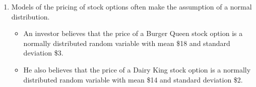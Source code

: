 \documentclass[12pt]{article} %
\newcommand{\Red}{\color{Red}}
\begin{document}
\begin{enumerate}
\newpage
\item Models of the pricing of stock options often make the assumption of a normal
distribution. 
	\begin{itemize}
		\item An investor believes that the price of a Burger Queen stock option is a normally distributed random variable with mean \$18 and standard deviation \$3.
		\item He also believes that the price of a Dairy King stock option is a normally distributed random variable with mean \$14 and standard deviation \$2.

\end{itemize}
\end{enumerate}
\end{document}
